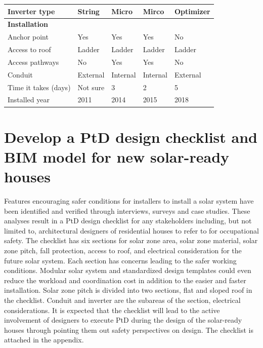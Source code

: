 \documentclass[]{article}
\begin{document}
\begin{table}[t]
\begin{tabular}{l|l|l|l|l}
\hline
\hspace{1em}Inverter type & String & Micro & Mirco & Optimizer\\
\hline
\multicolumn{5}{l}{\textbf{Installation}}\\
\hline
\hspace{1em}Anchor point & Yes & Yes & Yes & No\\
\hline
\hspace{1em}Access to roof & Ladder & Ladder & Ladder & Ladder\\
\hline
\hspace{1em}Access pathways & No & Yes & Yes & No\\
\hline
\hspace{1em}Conduit & External & Internal & Internal & External\\
\hline
\hspace{1em}Time it takes (days) & Not sure & 3 & 2 & 5\\
\hline
\hspace{1em}Installed year & 2011 & 2014 & 2015 & 2018\\
\hline
\end{tabular}
\end{table}

\hypertarget{develop-a-ptd-design-checklist-and-bim-model-for-new-solar-ready-houses}{%
\section{Develop a PtD design checklist and BIM model for new
solar-ready
houses}\label{develop-a-ptd-design-checklist-and-bim-model-for-new-solar-ready-houses}}

Features encouraging safer conditions for installers to install a solar
system have been identified and verified through interviews, surveys and
case studies. These analyses result in a PtD design checklist for any
stakeholders including, but not limited to, architectural designers of
residential houses to refer to for occupational safety. The checklist
has six sections for solar zone area, solar zone material, solar zone
pitch, fall protection, access to roof, and electrical consideration for
the future solar system. Each section has concerns leading to the safer
working conditions. Modular solar system and standardized design
templates could even reduce the workload and coordination cost in
addition to the easier and faster installation. Solar zone pitch is
divided into two sections, flat and sloped roof in the checklist.
Conduit and inverter are the subareas of the section, electrical
considerations. It is expected that the checklist will lead to the
active involvement of designers to execute PtD during the design of the
solar-ready houses through pointing them out safety perspectives on
design. The checklist is attached in the appendix.
\end{document}
